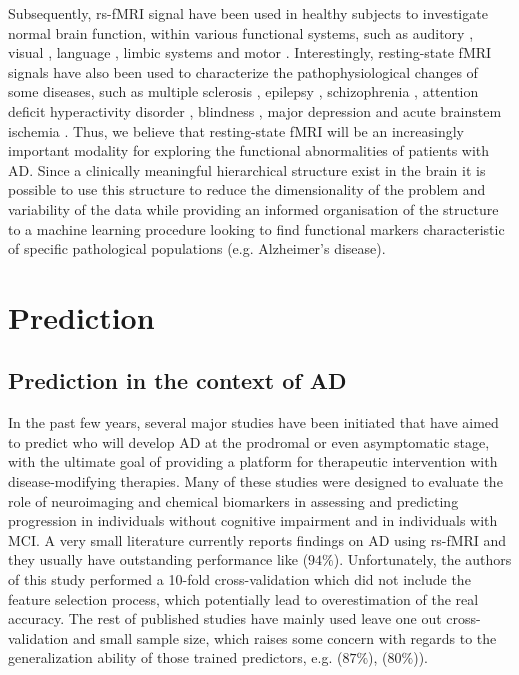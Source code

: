 Subsequently, rs-fMRI signal have been used in healthy subjects to investigate normal brain function, within various functional systems, such as auditory \citep{Cordes2001}, visual \citep{Lowe1998}, language \citep{Hampson2002}, limbic systems \citep{Greicius2003, Tian2007, Wink2006} and motor \citep{Jiang2004, Lowe1998}. Interestingly, resting-state fMRI signals have also been used to characterize the pathophysiological changes of some diseases, such as multiple sclerosis \citep{Lowe2002}, epilepsy \citep{Waites2006}, schizophrenia \citep{Liang2006, Salvador2007, Zhou2007, Zhou2008}, attention deficit hyperactivity disorder \citep{Tian2007, Zang2007}, blindness \citep{Liu2007, Yu2007}, major depression \citep{Anand2005, Greicius2007} and acute brainstem ischemia \citep{Salvador2005}. Thus, we believe that resting-state fMRI will be an increasingly important modality for exploring the functional abnormalities of patients with AD. Since a clinically meaningful hierarchical structure exist in the brain it is 
possible to use this structure to reduce the dimensionality of the problem and variability of the data while providing an informed organisation of the structure to a machine learning procedure looking to find functional markers characteristic of specific pathological populations (e.g. Alzheimer's disease).



\section{Prediction}
\subsection{Prediction in the context of AD}
In the past few years, several major studies have been initiated that have aimed to predict who will develop AD at the prodromal or even asymptomatic stage, with the ultimate goal of providing a platform for therapeutic intervention with disease-modifying therapies. Many of these studies were designed to evaluate the role of neuroimaging and chemical biomarkers in assessing and predicting progression in individuals without cognitive impairment and in individuals with MCI.
A very small literature currently reports findings on AD using rs-fMRI and they usually have outstanding performance like \citep{Jiang2014} ($94\%$). Unfortunately, the authors of this study performed a 10-fold cross-validation which did not include the feature selection process, which potentially lead to overestimation of the real accuracy. The rest of published studies have mainly used leave one out cross-validation and small sample size, which raises some concern with regards to the generalization ability of those trained predictors, e.g. \citep{Chen2011} ($87\%$), \citep{Dai2014} ($80\%$)).

